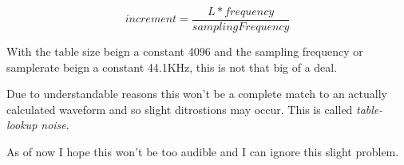 \documentclass{article}
\begin{document}
$$ 
increment = \frac{L * frequency}{samplingFrequency}
$$

\begin{cnote}
    With the table size beign a constant 4096 and the sampling frequency 
    or samplerate beign a constant 44.1KHz, this is not that big of a deal.
\end{cnote}

Due to understandable reasons this won't be a complete match 
to an actually calculated waveform and so slight ditrostions may 
occur. This is called \textit{table-lookup noise}.

As of now I hope this won't be too audible and I can 
ignore this slight problem.

\nocite{*}
\printbibliography[title=Bibliography] 
\end{document}
